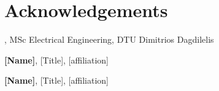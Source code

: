 \section*{Acknowledgements}
\textbf{\thesisauthor}, MSc Electrical Engineering, DTU \newline
Dimitrios Dagdilelis

\textbf{[Name]}, [Title], [affiliation] \newline
[text]

\textbf{[Name]}, [Title], [affiliation] \newline
[text]

